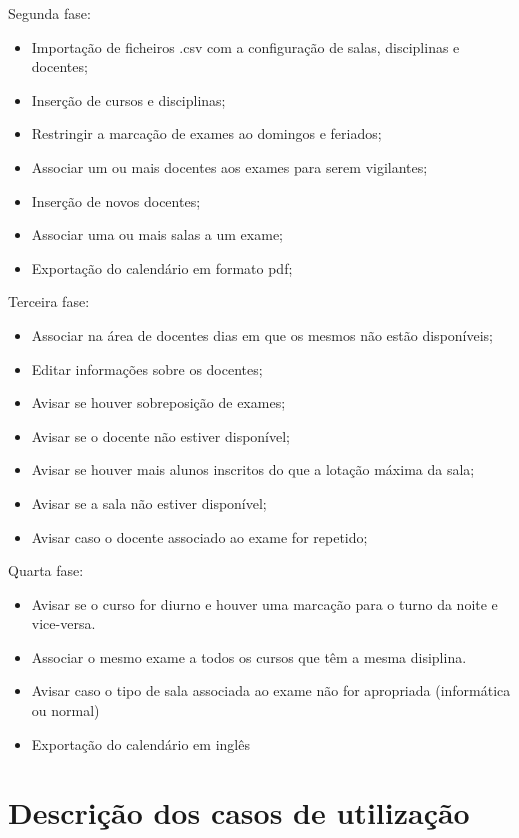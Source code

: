 \documentclass[11pt, twoside]{report}
\begin{document}
	Segunda fase:
	\begin{itemize}
		\item Importação de ficheiros .csv com a configuração de salas, disciplinas e docentes;
		\item Inserção de cursos e disciplinas;
		\item Restringir a marcação de exames ao domingos e feriados;
		\item Associar um ou mais docentes aos exames para serem vigilantes;
		\item Inserção de novos docentes;
		\item Associar uma ou mais salas a um exame;
		\item Exportação do calendário em formato pdf;
	\end{itemize}


	Terceira fase:
	\begin{itemize}
		\item Associar na área de docentes dias em que os mesmos não estão disponíveis;
		\item Editar informações sobre os docentes;
		\item Avisar se houver sobreposição de exames;
		\item Avisar se o docente não estiver disponível;
		\item Avisar se houver mais alunos inscritos do que a lotação máxima da sala;
		\item Avisar se a sala não estiver disponível;
		\item Avisar caso o docente associado ao exame for repetido;
	\end{itemize}
	
	Quarta fase:
	\begin{itemize}
		\item Avisar se o curso for diurno e houver uma marcação para o turno da noite e vice-versa.
		\item Associar o mesmo exame a todos os cursos que têm a mesma disiplina.
		\item Avisar caso o tipo de sala associada ao exame não for apropriada (informática ou normal)
		\item Exportação do calendário em inglês
	\end{itemize}

	
	\section{Descrição dos casos de utilização}
	
\end{document}
